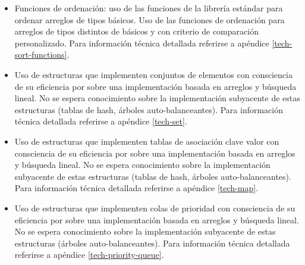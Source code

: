 \begin{itemize}
\item[\advanced]
Funciones de ordenación: uso de las funciones de la librería estándar para
ordenar arreglos de tipos básicos.
Uso de las funciones de ordenación para arreglos de tipos distintos de básicos
y con criterio de comparación personalizado.
Para información técnica detallada referirse a apéndice \ref{tech-sort-functions}.
\item[\advanced]
Uso de estructuras que implementen conjuntos de elementos con consciencia de su
eficiencia por sobre una implementación basada en arreglos y búsqueda lineal.
No se espera conocimiento sobre la implementación subyacente de estas
estructuras (tablas de hash, árboles auto-balanceantes).
Para información técnica detallada referirse a apéndice \ref{tech-set}.
\item[\advanced]
Uso de estructuras que implementen tablas de asociación clave valor con
consciencia de su eficiencia por sobre una implementación basada en arreglos y
búsqueda lineal.
No se espera conocimiento sobre la implementación subyacente de estas
estructuras (tablas de hash, árboles auto-balanceantes).
Para información técnica detallada referirse a apéndice \ref{tech-map}.
\item[\advanced]
Uso de estructuras que implementen colas de prioridad con consciencia de su
eficiencia por sobre una implementación basada en arreglos y búsqueda lineal.
No se espera conocimiento sobre la implementación subyacente de estas
estructuras (árboles auto-balanceantes).
Para información técnica detallada referirse a apéndice \ref{tech-priority-queue}.
\end{itemize}


